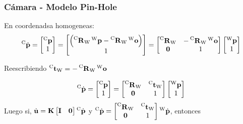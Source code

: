 \begin{frame}
    \frametitle{Cámara - Modelo Pin-Hole}
    
    \footnotesize
    En coordenadsa homogeneas:
    \begin{equation*}
    \homoCameraPoint = 
    \begin{bmatrix}
            \cameraPoint\\
            1
    \end{bmatrix}=
    \begin{bmatrix}
    \left( \rotationCoord{\cameraCoordSystem}{\worldCoordSystem} \worldPoint -\rotationCoord{\cameraCoordSystem}{\worldCoordSystem} \worldCameraCenter \right)\\
    1
    \end{bmatrix} = 
    \begin{bmatrix}
        \rotationCoord{\cameraCoordSystem}{\worldCoordSystem} & -\rotationCoord{\cameraCoordSystem}{\worldCoordSystem} \worldCameraCenter \\
        \vec{0} & 1
    \end{bmatrix}
    \begin{bmatrix}
     \worldPoint\\
     1
    \end{bmatrix}
    \end{equation*}

    Reescribiendo $\translationCoord{\cameraCoordSystem}{\worldCoordSystem} = -\rotationCoord{\cameraCoordSystem}{\worldCoordSystem} \worldCameraCenter$
    
    \begin{equation*}
    \homoCameraPoint = 
    \begin{bmatrix}
            \cameraPoint\\
            1
    \end{bmatrix}= 
    \begin{bmatrix}
        \rotationCoord{\cameraCoordSystem}{\worldCoordSystem} & \translationCoord{\cameraCoordSystem}{\worldCoordSystem} \\
        \vec{0} & 1
    \end{bmatrix}
    \begin{bmatrix}
        \worldPoint\\
        1
    \end{bmatrix}
    \end{equation*}
    Luego si, $\homoImagePoint=\intrinsicMatrix\begin{bmatrix} \vec{I} & \vec{0}\end{bmatrix} \homoCameraPoint$ y $\homoCameraPoint =     \begin{bmatrix}
        \rotationCoord{\cameraCoordSystem}{\worldCoordSystem} & \translationCoord{\cameraCoordSystem}{\worldCoordSystem} \\
        \vec{0} & 1
    \end{bmatrix}
    \homoWorldPoint$, entonces
    

\end{frame}
